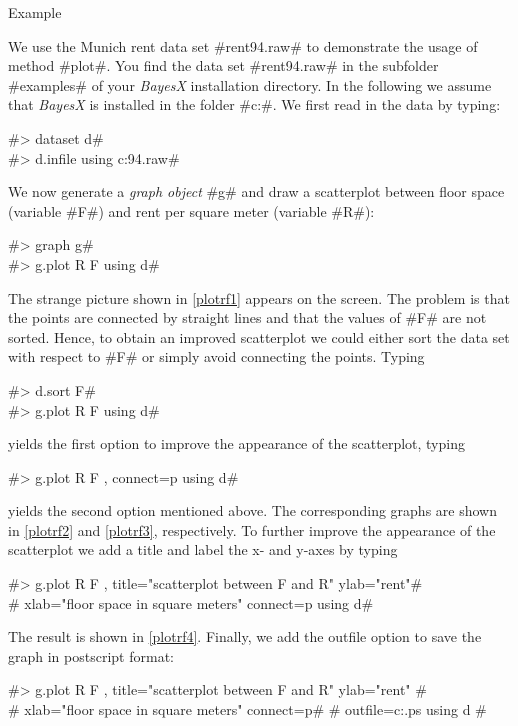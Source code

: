 \begin{stanza}{Example}

{We use the Munich rent data set #rent94.raw# to demonstrate the
usage of method #plot#. You find the data set #rent94.raw# in the
subfolder #examples# of your {\em BayesX} installation directory.
In the following we assume that {\em BayesX} is installed in the
folder #c:\bayesx#.
We first read in the data by typing:

#> dataset d# \\
#> d.infile using c:\bayesx\examples\rent94.raw#

We now generate a {\em graph object} #g# and draw a scatterplot
between floor space (variable #F#)
and rent per square meter (variable #R#):

#> graph g# \\
#> g.plot R F using d#

The strange picture shown in \autoref{plotrf1} appears on the
screen. The problem is that the points are connected by straight
lines and that the values of #F# are not sorted. Hence, to obtain
an improved scatterplot we could either sort the data set with
respect to #F# or simply avoid connecting the points.
Typing

#> d.sort F# \\
#> g.plot R F using d#

yields the first option to improve the appearance of the scatterplot, typing

#> g.plot R F , connect=p using d#

yields the second option mentioned above. The corresponding graphs
are shown in \autoref{plotrf2} and \autoref{plotrf3},
respectively. To further improve the appearance of the scatterplot
we add a title and label the x- and y-axes
by typing

#> g.plot R F , title="scatterplot between F and R" ylab="rent"# \\
#  xlab="floor space in square meters" connect=p using d#

The result is shown in \autoref{plotrf4}.
Finally, we add the outfile option to save the graph in postscript format:

 #> g.plot R F , title="scatterplot between F and R" ylab="rent" #\\
 #  xlab="floor space in square meters" connect=p#
 #  outfile=c:\temp\plotrf.ps using d #

}
\end{stanza}

